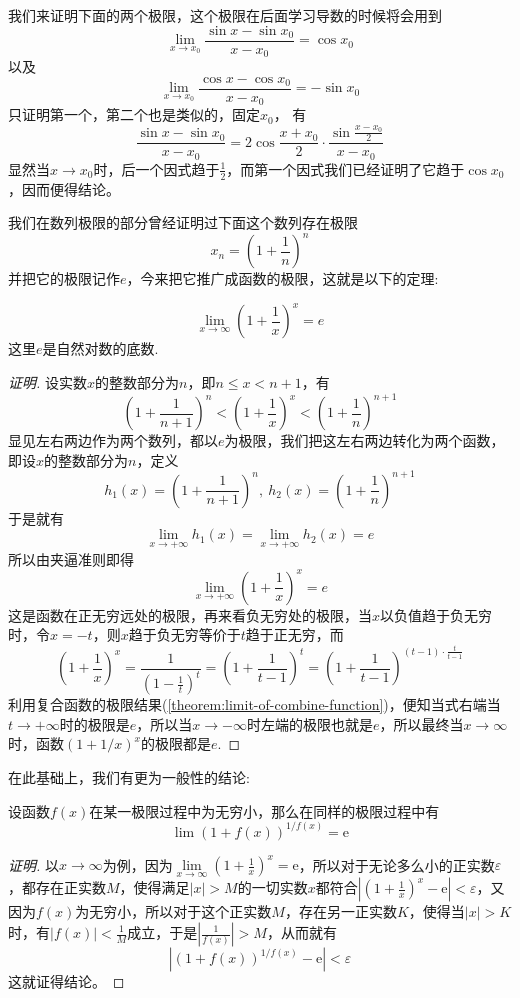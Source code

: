 \begin{example}
  \label{example:limit-of-sinx-sinx0-over-x-x0}
  我们来证明下面的两个极限，这个极限在后面学习导数的时候将会用到
  \[ \lim_{x \to x_0} \frac{\sin{x}-\sin{x_0}}{x-x_0} = \cos{x_0} \]
  以及
  \[ \lim_{x \to x_0} \frac{\cos{x}-\cos{x_0}}{x-x_0} = -\sin{x_0} \]
  只证明第一个，第二个也是类似的，固定$x_0$，
  有
  \[ \frac{\sin{x}-\sin{x_0}}{x-x_0} = 2\cos{\frac{x+x_0}{2}} \cdot \frac{\sin{\frac{x-x_0}{2}}}{x-x_0} \]
  显然当$x \to x_0$时，后一个因式趋于$\frac{1}{2}$，而第一个因式我们已经证明了它趋于$\cos{x_0}$，因而便得结论。
\end{example}

我们在数列极限的部分曾经证明过下面这个数列存在极限
\[ x_n = \left( 1+\frac{1}{n} \right)^n \]
并把它的极限记作$e$，今来把它推广成函数的极限，这就是以下的定理:
\begin{theorem}
  \[ \lim_{x \to \infty} \left( 1+\frac{1}{x} \right)^x = e \]
  这里$e$是自然对数的底数.
\end{theorem}

\begin{proof}[证明]
  设实数$x$的整数部分为$n$，即$n \leqslant x < n+1$，有
  \[ \left( 1+\frac{1}{n+1} \right)^n < \left( 1+\frac{1}{x} \right)^x < \left( 1+\frac{1}{n} \right)^{n+1} \]
  显见左右两边作为两个数列，都以$e$为极限，我们把这左右两边转化为两个函数，即设$x$的整数部分为$n$，定义
  \[ h_1(x) =  \left( 1+\frac{1}{n+1} \right)^n, \ h_2(x)=\left( 1+\frac{1}{n} \right)^{n+1} \]
  于是就有
  \[ \lim_{x \to +\infty} h_1(x) = \lim_{x \to +\infty} h_2(x) = e \]
  所以由夹逼准则即得
  \[ \lim_{x \to +\infty} \left( 1+\frac{1}{x} \right)^x = e \]
  这是函数在正无穷远处的极限，再来看负无穷处的极限，当$x$以负值趋于负无穷时，令$x=-t$，则$x$趋于负无穷等价于$t$趋于正无穷，而
  \[ \left( 1+\frac{1}{x} \right)^x = \frac{1}{\left( 1-\frac{1}{t} \right)^t} = \left( 1+\frac{1}{t-1} \right)^t = \left( 1+\frac{1}{t-1} \right)^{(t-1) \cdot \frac{t}{t-1}} \]
  利用复合函数的极限结果(\autoref{theorem:limit-of-combine-function})，便知当式右端当$t \to +\infty$时的极限是$e$，所以当$x \to -\infty$时左端的极限也就是$e$，所以最终当$x \to \infty$时，函数$(1+1/x)^x$的极限都是$e$.
\end{proof}

在此基础上，我们有更为一般性的结论:
\begin{theorem}
  设函数$f(x)$在某一极限过程中为无穷小，那么在同样的极限过程中有
  \[ \lim (1+f(x))^{1/f(x)} = \mathrm{e} \]
\end{theorem}

\begin{proof}[证明]
  以$x \to \infty$为例，因为$\lim\limits_{x \to \infty}(1+\frac{1}{x})^x = \mathrm{e}$，所以对于无论多么小的正实数$\varepsilon$，都存在正实数$M$，使得满足$|x|>M$的一切实数$x$都符合$|(1+\frac{1}{x})^x-\mathrm{e}|<\varepsilon$，又因为$f(x)$为无穷小，所以对于这个正实数$M$，存在另一正实数$K$，使得当$|x|>K$时，有$|f(x)|<\frac{1}{M}$成立，于是$\left| \frac{1}{f(x)} \right|>M$，从而就有
  \[ \left| (1+f(x))^{1/f(x)} - \mathrm{e} \right| < \varepsilon \]
  这就证得结论。
\end{proof}

